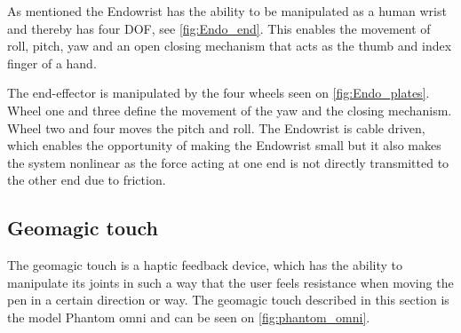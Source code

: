 \documentclass[conference]{IEEEtran}
\begin{document}
As mentioned the Endowrist has the ability to be manipulated as a human wrist and thereby has four DOF, see \ref{fig:Endo_end}. This enables the movement of roll, pitch, yaw and an open closing mechanism that acts as the thumb and index finger of a hand. 

The end-effector is manipulated by the four wheels seen on \ref{fig:Endo_plates}. Wheel one and three define the movement of the yaw and the closing mechanism. Wheel two and four moves the pitch and roll. The Endowrist is cable driven, which enables the opportunity of making the Endowrist small but it also makes the system nonlinear as the force acting at one end is not directly transmitted to the other end due to friction. 

\subsection{Geomagic touch}
The geomagic touch is a haptic feedback device, which has the ability to manipulate its joints in such a way that the user feels resistance when moving the pen in a certain direction or way. 
The geomagic touch described in this section is the model Phantom omni and can be seen on \ref{fig:phantom_omni}.
\end{document}
